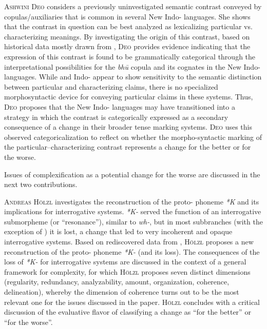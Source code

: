 \documentclass[output=paper,colorlinks,citecolor=brown]{langscibook}
\begin{document}
\textsc{Ashwini Deo} considers a previously uninvestigated semantic contrast conveyed by copulas/auxiliaries that is common in several New Indo- languages. She shows that the contrast in question can be best analyzed as lexicalizing particular vs. characterizing meanings. By investigating the origin of this contrast, based on historical data mostly drawn from , \textsc{Deo} provides evidence indicating that the expression of this contrast is found to be grammatically categorical through the interpretational possibilities for the \textit{bh\={u}} copula and its cognates in the  New Indo- languages.  While  and  Indo- appear to show sensitivity to the semantic distinction between particular and characterizing claims, there is no specialized morphosyntactic device for conveying particular claims in these systems. Thus, \textsc{Deo} proposes that the New Indo- languages may have transitioned into a strategy in which the contrast is categorically expressed as a secondary consequence of a change in their broader tense marking systems. \textsc{Deo} uses this observed categoricalization to reflect on whether the morpho-syntactic marking of the particular–characterizing contrast represents a change for the better or for the worse.

Issues of complexification as a potential change for the worse are discussed in the next two contributions.

\textsc{Andreas Hölzl} investigates the reconstruction of the proto- pho\-neme \textit{*K} and its implications for  interrogative systems. \textit{*K-} served the function of an interrogative submorpheme (or ``resonance''), similar to  \textit{wh-}, but in most  subbranches (with the exception of ) it is lost, a change that led to very incoherent and opaque interrogative systems. Based on rediscovered data from , \textsc{Hölzl} proposes a new reconstruction of the proto- phoneme \textit{*K-} (and its loss). The consequences of the loss of \textit{*K-} for interrogative systems are discussed in the context of a general framework for complexity, for which \textsc{Hölzl} proposes seven distinct dimensions (regularity, redundancy, analyzability, amount, organization, coherence, delineation), whereby the dimension of coherence turns out to be the most relevant one for the issues discussed in the paper. \textsc{Hölzl} concludes with a critical discussion of the evaluative flavor of classifying a change as ``for the better'' or ``for the worse''.
\end{document}
